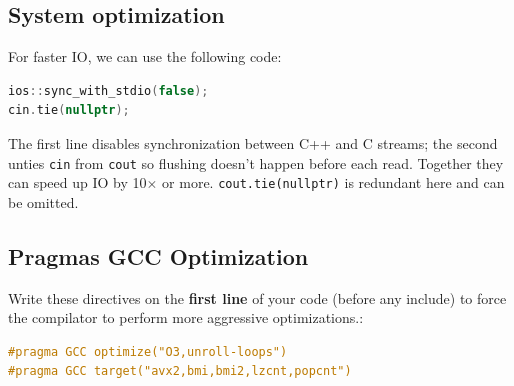 \subsection{System optimization}

For faster IO, we can use the following code:
\begin{lstlisting}[language=C++]
ios::sync_with_stdio(false);
cin.tie(nullptr);
\end{lstlisting}
The first line disables synchronization between C++ and C streams; the second unties \texttt{cin} from \texttt{cout} so flushing doesn't happen before each read. Together they can speed up IO by 10$\times$ or more. \texttt{cout.tie(nullptr)} is redundant here and can be omitted.

\subsection{Pragmas GCC Optimization}
Write these directives on the \textbf{first line} of your code (before any include) to force the compilator to perform more aggressive optimizations.:

\begin{lstlisting}[language=C++]
#pragma GCC optimize("O3,unroll-loops")
#pragma GCC target("avx2,bmi,bmi2,lzcnt,popcnt")
\end{lstlisting}
